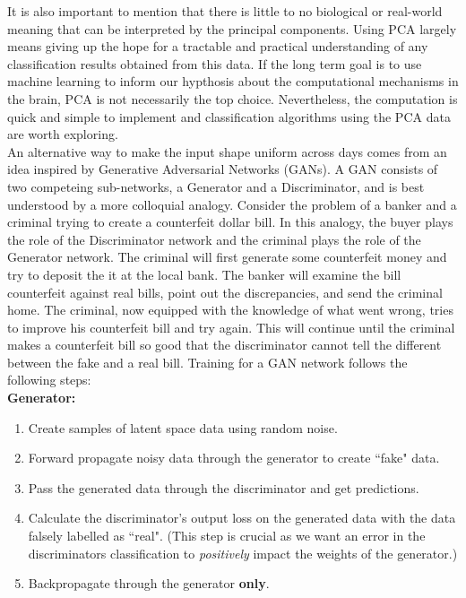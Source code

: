 \documentclass[12pt]{article}
\begin{document}
 \indent It is also important to mention that there is little to no biological or real-world meaning that can be interpreted by the principal components. Using PCA largely means giving up the hope for a tractable and practical understanding of any classification results obtained from this data. If the long term goal is to use machine learning to inform our hypthosis about the computational mechanisms in the brain, PCA is not necessarily the top choice. Nevertheless, the computation is quick and simple to implement and classification algorithms using the PCA data are worth exploring. \\
\indent An alternative way to make the input shape uniform across days comes from an idea inspired by Generative Adversarial Networks (GANs). A GAN consists of two competeing sub-networks, a Generator and a Discriminator, and is best understood by a more colloquial analogy. Consider the problem of a banker and a criminal trying to create a counterfeit dollar bill. In this analogy, the buyer plays the role of the Discriminator network and the criminal plays the role of the Generator network. The criminal will first generate some counterfeit money and try to deposit the it at the local bank. The banker will examine the bill counterfeit against real bills, point out the discrepancies, and send the criminal home. The criminal, now equipped with the knowledge of what went wrong, tries to improve his counterfeit bill and try again. This will continue until the criminal makes a counterfeit bill so good that the discriminator cannot tell the different between the fake and a real bill. Training for a GAN network follows the following steps:  \\
\textbf{Generator:} \\
\begin{enumerate}
  \item Create samples of latent space data using random noise.
  \item Forward propagate noisy data through the generator to create ``fake" data.
  \item Pass the generated data through the discriminator and get predictions.
  \item Calculate the discriminator's output loss on the generated data with the data falsely labelled as ``real". (This step is crucial as we want an error in the discriminators classification to \textit{positively} impact the weights of the generator.)
  \item Backpropagate through the generator \textbf{only}.
  \end{enumerate}
\end{document}

